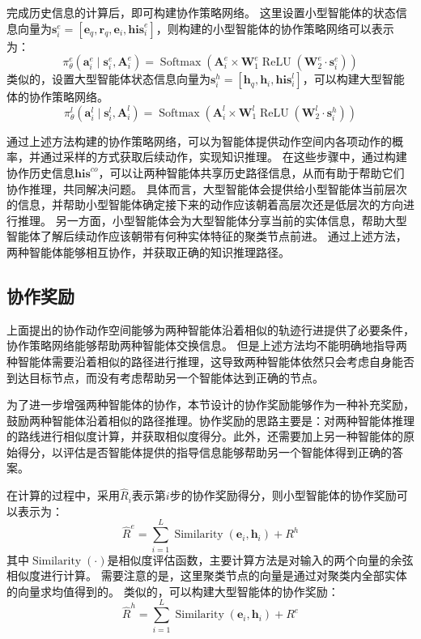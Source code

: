 \documentclass[algorithmlist, AutoFakeBold, AutoFakeSlant, figurelist, tablelist, nomlist, engineering, openany]{seuthesix} %
\begin{document}
完成历史信息的计算后，即可构建协作策略网络。
这里设置小型智能体的状态信息向量为$\bm{s}_i^{e} = \left[\bm{e}_q, \bm{r}_q, \bm{e}_i, \bm{his}_i^e\right]$，则构建的小型智能体的协作策略网络可以表示为：
\begin{equation}
  \pi_\theta^e\left(\bm{a}_i^e \mid \bm{s}_i^e, \bm{A}_i^e\right) =\operatorname{Softmax}\left(\bm{A}_i^e \times \mathbf{W}_1^e \operatorname{ReLU}\left(\mathbf{W}_2^e \cdot \bm{s}_i^{e}\right)\right)
  \label{pi_1}
\end{equation}
类似的，设置大型智能体状态信息向量为$\bm{s}_i^{h} = \left[\bm{h}_q, \bm{h}_i, \bm{his}_i^l\right]$，可以构建大型智能体的协作策略网络。
\begin{equation}
  \pi_\theta^l\left(\bm{a}_i^l \mid \bm{s}_i^l, \bm{A}_i^l\right) =\operatorname{Softmax}\left(\bm{A}_i^l \times \mathbf{W}_1^l \operatorname{ReLU}\left(\mathbf{W}_2^l \cdot \bm{s}_i^{h}\right)\right)
  \label{pi_2}
\end{equation}

通过上述方法构建的协作策略网络，可以为智能体提供动作空间内各项动作的概率，并通过采样的方式获取后续动作，实现知识推理。
在这些步骤中，通过构建协作历史信息$\bm{his}^{co}$，可以让两种智能体共享历史路径信息，从而有助于帮助它们协作推理，共同解决问题。
具体而言，大型智能体会提供给小型智能体当前层次的信息，并帮助小型智能体确定接下来的动作应该朝着高层次还是低层次的方向进行推理。
另一方面，小型智能体会为大型智能体分享当前的实体信息，帮助大型智能体了解后续动作应该朝带有何种实体特征的聚类节点前进。
通过上述方法，两种智能体能够相互协作，并获取正确的知识推理路径。

\subsection{协作奖励}
上面提出的协作动作空间能够为两种智能体沿着相似的轨迹行进提供了必要条件，协作策略网络能够帮助两种智能体交换信息。
但是上述方法均不能明确地指导两种智能体需要沿着相似的路径进行推理，这导致两种智能体依然只会考虑自身能否到达目标节点，而没有考虑帮助另一个智能体达到正确的节点。

为了进一步增强两种智能体的协作，本节设计的协作奖励能够作为一种补充奖励，鼓励两种智能体沿着相似的路径推理。协作奖励的思路主要是：对两种智能体推理的路线进行相似度计算，并获取相似度得分。此外，还需要加上另一种智能体的原始得分，以评估是否智能体提供的指导信息能够帮助另一个智能体得到正确的答案。

在计算的过程中，采用$\hat{R}_i$表示第$i$步的协作奖励得分，则小型智能体的协作奖励可以表示为：
\begin{equation}
  \hat{R}^e = \sum_{i=1}^{L} \operatorname{Similarity}(\bm{e}_i, \bm{h}_i) + R^h
  \label{similar_1}
\end{equation}
其中$\operatorname{Similarity}(\cdot)$是相似度评估函数，主要计算方法是对输入的两个向量的余弦相似度进行计算。
需要注意的是，这里聚类节点的向量是通过对聚类内全部实体的向量求均值得到的。
类似的，可以构建大型智能体的协作奖励：
\begin{equation}
  \hat{R}^h = \sum_{i=1}^{L} \operatorname{Similarity}(\bm{e}_i, \bm{h}_i) + R^e
  \label{similar_2}
\end{equation}
\end{document}
